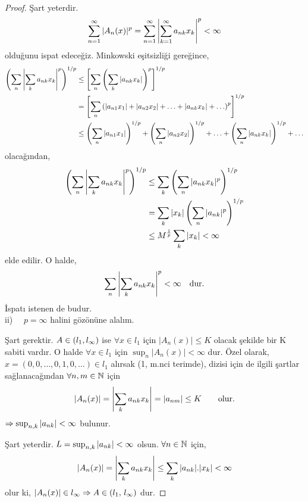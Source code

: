 \begin{proof}
Şart yeterdir.
$$
\sum\limits_{n=1}^\infty |A_n(x)|^p=\sum\limits_{n=1}^\infty\left|\sum\limits_{k=1}^\infty a_{nk} x_k\right|^p<\infty
$$
olduğunu ispat edeceğiz. Minkowski eşitsizliği gereğince,
$$
\begin{aligned}
\left(\sum_n\left|\sum_ka_{nk} x_k\right|^p\right)^{1/p}&\leq\left[\sum_n\left(\sum_k|a_{nk} x_k|\right)^p\right]^{1/p}\\
&=\left[\sum_n\left(|a_{n1}x_1|+|a_{n2}x_2|+\ldots+|a_{nk} x_k|+\ldots\right)^p\right]^{1/p}\\
&\leq\left(\sum_n|a_{n1}x_1|\right)^{1/p}+\left(\sum_n|a_{n2}x_2|\right)^{1/p}+\ldots+\left(\sum_n|a_{nk} x_k|\right)^{1/p}+\ldots
\end{aligned}
$$ olacağından,
$$
\begin{aligned}
\left(\sum_n\left|\sum_ka_{nk} x_k\right|^p\right)^{1/p}&\leq\sum_k\left(\sum_n|a_{nk} x_k|^p\right)^{1/p}\\
&=\sum_k|x_k|\left(\sum_n|a_{nk}|^p\right)^{1/p}\\
&\leq M^{\frac{1}{p}} \sum_k|x_k|<\infty
\end{aligned}
$$
elde edilir. \newpage O halde, 
$$
\sum_n\left|\sum_ka_{nk} x_k\right|^p<\infty\quad\text{dur.}
$$ İspatı istenen de  budur.\\[5pt]
ii) $\quad p=\infty$ halini gözönüne alalım.

Şart gerektir. $A\in(l_1,l_\infty)$ ise $\forall x\in l_1$ için $|A_n(x)|\leq K$ olacak şekilde bir K sabiti vardır. O halde $\forall x\in l_1$ için $\sup_n|A_n(x)|<\infty$ dur. Özel olarak, $x=(0,0,\ldots,0,1,0,\ldots)\in l_1$ alırsak (1, m.nci terimde),  dizisi için de ilgili şartlar sağlanacağından $\forall n,m\in\mathbb{N}$ için
$$
|A_n(x)|=\left|\sum_ka_{nk} x_k\right|=|a_{nm}|\leq K\qquad\text{olur.}
$$
$\Rightarrow\sup_{n,k}|a_{nk}|<\infty$ bulunur.

Şart yeterdir. $L=\sup_{n,k}|a_{nk}|<\infty$ olsun. $\forall n\in\mathbb{N}$ için,
$$
|A_n(x)|=\left|\sum_ka_{nk} x_k\right|\leq\sum_k|a_{nk}|.|x_k|<\infty
$$
olur ki, $|A_n(x)|\in l_\infty\Rightarrow A\in(l_1,\,l_\infty)$ dur.
\end{proof}







